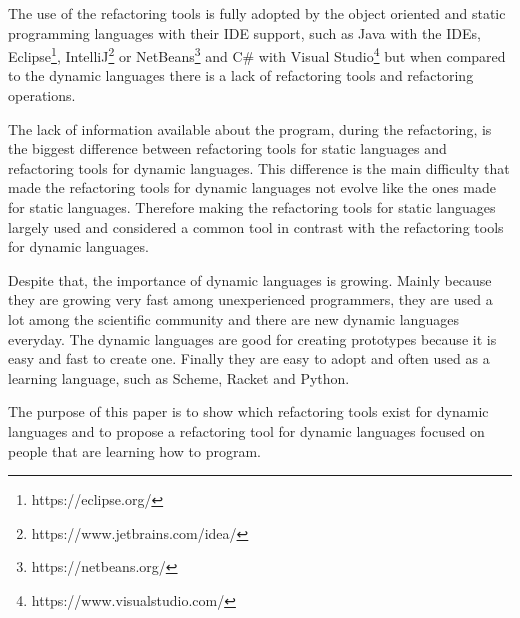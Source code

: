 The use of the refactoring tools is fully adopted by the object oriented and static programming languages with their IDE support, such as Java with the IDEs, Eclipse\footnote{https://eclipse.org/}, IntelliJ\footnote{https://www.jetbrains.com/idea/} or NetBeans\footnote{https://netbeans.org/} and C\# with Visual Studio\footnote{https://www.visualstudio.com/} but when %
compared to the dynamic languages there is a lack of refactoring tools and refactoring operations.

The lack of information available about the program, during the refactoring, is the biggest difference between refactoring tools for static languages and refactoring tools for dynamic languages.
This difference is the main difficulty that made the refactoring tools for dynamic languages not evolve like the ones made for static languages. 
Therefore making the refactoring tools for static languages largely used and considered a common tool in contrast with the refactoring tools for dynamic languages.  %

Despite that, the importance of dynamic languages is growing. Mainly because they are growing very fast among unexperienced programmers, they are used a lot among the scientific community and there are new dynamic languages everyday. 
The dynamic languages are good for creating prototypes because it is easy and fast to create one. Finally they are easy to adopt and often used as a learning language, such as Scheme, Racket and Python. %


The purpose of this paper is to show which refactoring tools exist for dynamic languages and to propose a refactoring tool for dynamic languages focused on people that are learning how to program. %







